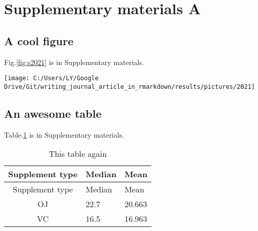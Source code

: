 \documentclass[review]{elsarticle} %
\let\origfigure\figure
\let\endorigfigure\endfigure
\renewenvironment{figure}[1][2] {
    \expandafter\origfigure\expandafter[H]
} {
    \endorigfigure
}
\begin{document}
\newpage

\appendix


\renewcommand{\thefigure}{A.\arabic{figure}}

\setcounter{figure}{0} \renewcommand{\thetable}{A.\arabic{table}}
\setcounter{table}{0} \renewcommand{\theequation}{A.\arabic{equation}}
\setcounter{equation}{0}

\section{Supplementary materials A}\label{appendixA}

\subsection{A cool figure}\label{a-cool-figure}

Fig.\ref{fig:s2021} is in Supplementary materials.

\begin{figure}

{\centering \texttt{[image: C:/Users/LY/Google Drive/Git/writing\_journal\_article\_in\_rmarkdown/results/pictures/2021]} 

}

\caption{A plot in Supplementary Materials}\label{fig:s2021}
\end{figure}

\subsection{An awesome table}\label{an-awesome-table}

Table.\ref{tab:stable} is in Supplementary materials.

\begin{longtable}[]{@{}cll@{}}
\caption{\label{tab:unnamed-chunk-11}\label{tab:stable}This table
again}\tabularnewline
\toprule
Supplement type & Median & Mean\tabularnewline
\midrule
\endfirsthead
\toprule
Supplement type & Median & Mean\tabularnewline
\midrule
\endhead
OJ & 22.7 & 20.663\tabularnewline
VC & 16.5 & 16.963\tabularnewline
\bottomrule
\end{longtable}

\newpage

\renewcommand{\thefigure}{B.\arabic{figure}}

\setcounter{figure}{0} \renewcommand{\thetable}{B.\arabic{table}}
\setcounter{table}{0} \renewcommand{\theequation}{B.\arabic{equation}}
\setcounter{equation}{0}
\end{document}
